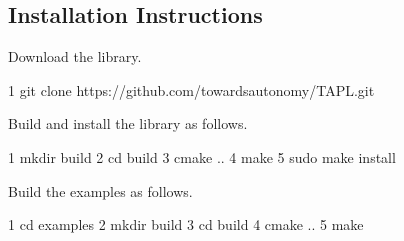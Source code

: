 \subsection*{Installation Instructions}


\begin{DoxyItemize}
\item Download the library.
\end{DoxyItemize}


\begin{DoxyCode}
1 git clone https://github.com/towardsautonomy/TAPL.git
\end{DoxyCode}



\begin{DoxyItemize}
\item Build and install the library as follows.
\end{DoxyItemize}


\begin{DoxyCode}
1 mkdir build  
2 cd build
3 cmake ..
4 make
5 sudo make install
\end{DoxyCode}



\begin{DoxyItemize}
\item Build the examples as follows.
\end{DoxyItemize}


\begin{DoxyCode}
1 cd examples
2 mkdir build
3 cd build
4 cmake ..
5 make
\end{DoxyCode}
 